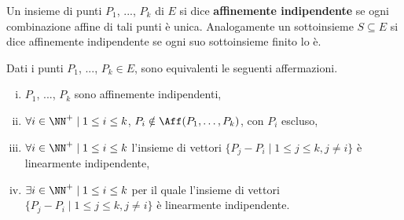 \documentclass[11pt]{article}
\begin{document}
	\begin{definition} 
		Un insieme di punti $P_1$, ..., $P_k$ di $E$ si dice \textbf{affinemente indipendente} se ogni
		combinazione affine di tali punti è unica. Analogamente un sottoinsieme $S \subseteq E$ si dice
		affinemente indipendente se ogni suo sottoinsieme finito lo è.
	\end{definition}
	
	\begin{proposition}
		Dati i punti $P_1$, ..., $P_k \in E$, sono equivalenti le seguenti affermazioni.
		
		\begin{enumerate}[(i)]
			\item $P_1$, ..., $P_k$ sono affinemente indipendenti,
				
			\item $\forall i \in \NN^+ \mid 1 \leq i \leq k$, $P_i \notin \Aff(P_1, \ldots, P_k)$,
				con $P_i$ escluso,

			\item $\forall i \in \NN^+ \mid 1 \leq i \leq k$ l'insieme di vettori
				$\{ P_j - P_i \mid 1 \leq j \leq k, j \neq i \}$ è linearmente indipendente,
				
			\item $\exists i \in \NN^+ \mid 1 \leq i \leq k$ per il quale l'insieme di vettori
				$\{ P_j - P_i \mid 1 \leq j \leq k, j \neq i \}$ è linearmente indipendente.
		\end{enumerate}
	\end{proposition}
	
\end{document}
